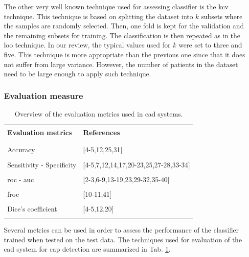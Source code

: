 The other very well known technique used for assessing classifier is the \acf{kcv} technique. This technique is based on splitting the dataset into $k$ subsets where the samples are randomly selected. Then, one fold is kept for the validation and the remaining subsets for training. The classification is then repeated as in the \ac{loo} technique. In our review, the typical values used for $k$ were set to three and five. This technique is more appropriate than the previous one since that it does not suffer from large variance. However, the number of patients in the dataset need to be large enough to apply such technique.

\subsubsection{Evaluation measure}\label{subsubsec:eval}

\begin{table}
	\caption{Overview of the evaluation metrics used in \ac{cad} systems.}
	\small
	\begin{tabular}{p{.55\linewidth} p{.35\linewidth}}
		\hline \\ [-1.5ex]
		\textbf{Evaluation metrics} & \textbf{References} \\ \\ [-1.5ex]
		\hline \\ [-1.5ex]
		\quad Accuracy & $[$4-5,12,25,31$]$ \\ \\ [-1.5ex]
		\quad Sensitivity - Specificity & $[$4-5,7,12,14,17,20-23,25,27-28,33-34$]$ \\ \\ [-1.5ex]
		\quad \acs{roc} - \acs{auc} & $[$2-3,6-9,13-19,23,29-32,35-40$]$ \\ \\ [-1.5ex]
		\quad \acs{froc} & $[$10-11,41$]$ \\ \\ [-1.5ex]
		\quad Dice's coefficient & $[$4-5,12,20$]$ \\ \\ [-1.5ex]
		\hline
	\end{tabular}
	\label{tab:evatec}
\end{table}

Several metrics can be used in order to assess the performance of the classifier trained when tested on the test data. The techniques used for evaluation of the \ac{cad} system for \ac{cap} detection are summarized in Tab. \ref{tab:evatec}.

